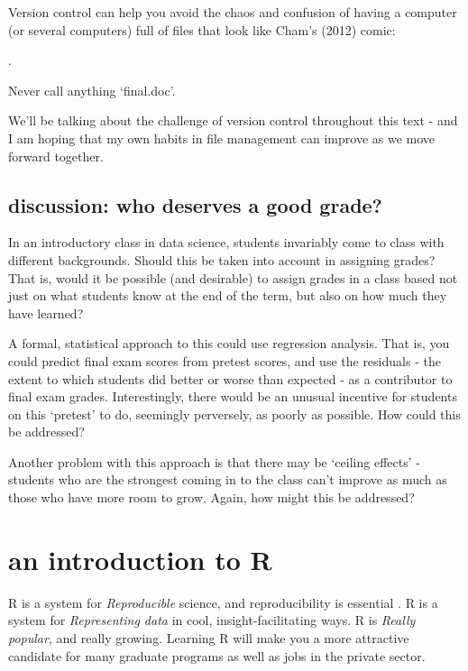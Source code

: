 \documentclass[openany]{book}
\begin{document}
Version control can help you avoid the chaos and confusion of having a computer (or several computers) full of files that look like Cham's (2012) comic:

.

Never call anything `final.doc'.

We'll be talking about the challenge of version control throughout this text - and I am hoping that my own habits in file management can improve as we move forward together.

\hypertarget{discussion-who-deserves-a-good-grade}{%
\section{discussion: who deserves a good grade?}\label{discussion-who-deserves-a-good-grade}}

In an introductory class in data science, students invariably come to class with different backgrounds. Should this be taken into account in assigning grades? That is, would it be possible (and desirable) to assign grades in a class based not just on what students know at the end of the term, but also on how much they have learned?

A formal, statistical approach to this could use regression analysis. That is, you could predict final exam scores from pretest scores, and use the residuals - the extent to which students did better or worse than expected - as a contributor to final exam grades. Interestingly, there would be an unusual incentive for students on this `pretest' to do, seemingly perversely, as poorly as possible. How could this be addressed?

Another problem with this approach is that there may be `ceiling effects' - students who are the strongest coming in to the class can't improve as much as those who have more room to grow. Again, how might this be addressed?

\hypertarget{an-introduction-to-r}{%
\chapter{an introduction to R}\label{an-introduction-to-r}}

R is a system for \emph{Reproducible} science, and reproducibility is essential \citep{baumer2014r}. R is a system for \emph{Representing data} in cool, insight-facilitating ways. R is \emph{Really popular}, and really growing. Learning R will make you a more attractive candidate for many graduate programs as well as jobs in the private sector.
\end{document}
